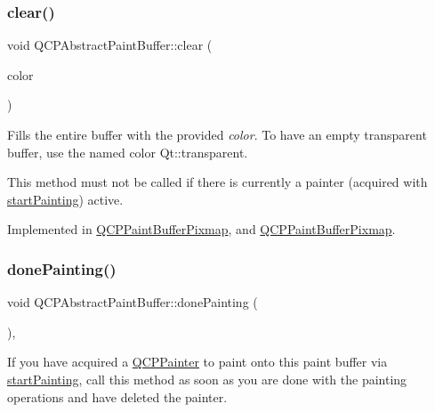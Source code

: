 \subsubsection{\texorpdfstring{clear()}{clear()}}
{\footnotesize\ttfamily void Q\+C\+P\+Abstract\+Paint\+Buffer\+::clear (\begin{DoxyParamCaption}\item[{const Q\+Color \&}]{color }\end{DoxyParamCaption})\hspace{0.3cm}{\ttfamily [pure virtual]}}

Fills the entire buffer with the provided {\itshape color}. To have an empty transparent buffer, use the named color {\ttfamily Qt\+::transparent}.

This method must not be called if there is currently a painter (acquired with \hyperlink{class_q_c_p_abstract_paint_buffer_a9e9f29b19c033cf02fb96f1a148463f3}{start\+Painting}) active. 

Implemented in \hyperlink{class_q_c_p_paint_buffer_pixmap_a14badbd010a3cde6b55817ccb7b65217}{Q\+C\+P\+Paint\+Buffer\+Pixmap}, and \hyperlink{class_q_c_p_paint_buffer_pixmap_a14badbd010a3cde6b55817ccb7b65217}{Q\+C\+P\+Paint\+Buffer\+Pixmap}.

\mbox{\label{class_q_c_p_abstract_paint_buffer_a41b0dc6e7744f19fae09f8532c207dc1}} 
\subsubsection{\texorpdfstring{done\+Painting()}{donePainting()}}
{\footnotesize\ttfamily void Q\+C\+P\+Abstract\+Paint\+Buffer\+::done\+Painting (\begin{DoxyParamCaption}{ }\end{DoxyParamCaption})\hspace{0.3cm}{\ttfamily [inline]}, {\ttfamily [virtual]}}

If you have acquired a \hyperlink{class_q_c_p_painter}{Q\+C\+P\+Painter} to paint onto this paint buffer via \hyperlink{class_q_c_p_abstract_paint_buffer_a9e9f29b19c033cf02fb96f1a148463f3}{start\+Painting}, call this method as soon as you are done with the painting operations and have deleted the painter.

